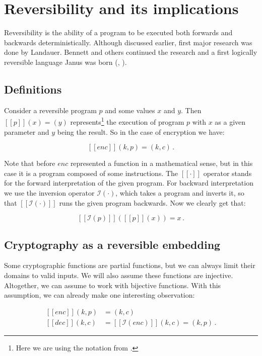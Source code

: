 \documentclass[a4paper,10pt,openright]{memoir}
\def\enc{\ensuremath{\mathit{enc}}}
\def\dec{\ensuremath{\mathit{dec}}}
\newcommand{\inv}[1]{\ensuremath{\mathcal{I}(#1)}}
\newcommand{\exe}[1]{\ensuremath{[\![#1]\!]}}
\begin{document}
\section{Reversibility and its implications}

Reversibility is the ability of a program to be executed both forwards 
and backwards deterministically. Although discussed earlier, first 
major research was done by Landauer\cite{Landauer61}. 
Bennett\cite{Bennett73} and others continued the research and a first 
logically reversible language Janus was born (\cite{janus86}, 
\cite{Yokoyama2010}).

\subsection{Definitions}

Consider a reversible program $p$ and some values $x$ and $y$. Then 
$\exe{p}(x) = (y)$ represents\footnote{Here we are using the notation 
from \cite{Jones93}.} the execution of program $p$ with $x$ as a given 
parameter and $y$ being the result. So in the case of encryption we 
have:

$$
\exe{\enc}(k,p) = (k,c) \,.
$$

Note that before $\enc$ represented a function in a mathematical sense, 
but in this case it is a program composed of some instructions. The 
$\exe{\cdot}$ operator stands for the forward interpretation of the 
given program. For backward interpretation we use the inversion 
operator $\inv{\cdot}$, which takes a program and inverts it, so that 
$\exe{\inv{\cdot}}$ runs the given program backwards. Now we clearly 
get that:

$$
\exe{\inv{p}}(\exe{p}(x)) = x \,.
$$


\subsection{Cryptography as a reversible embedding}
\label{crypto-embed}

Some cryptographic functions are partial functions, but we can always 
limit their domains to valid inputs. We will also assume these 
functions are injective. Altogether, we can assume to work with 
bijective functions. With this assumption, we can already make one 
interesting observation:

\begin{align*}
\exe{\enc}(k,p) &= (k,c) \\
\exe{\dec}(k,c) &= \exe{\inv{\enc}}(k,c) = (k,p) \,.
\end{align*}
\end{document}

